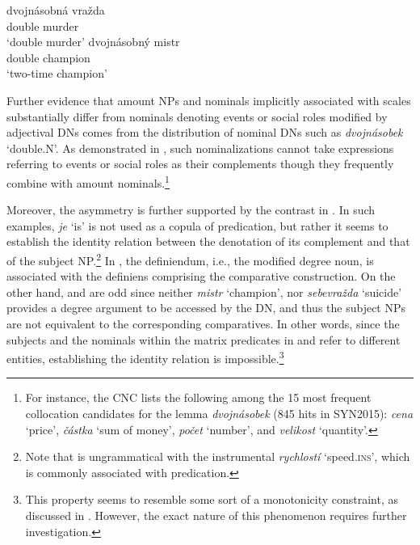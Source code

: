\documentclass[output=paper,modfonts,hidelinks,newtxmath
\ChapterDOI{10.5281/zenodo.2545513}
]{langscibook}
\begin{document}
\ea \label{dvojnasobny} \ea \gll\label{dvojnasobna-vrazda}dvojnásobná vražda\\
double murder\\
\glt `double murder'
\ex \gll dvojnásobný mistr\label{dvojnasobny-mistr}\\
double champion\\
\glt `two-time champion'
\z \z

\largerpage[2]
\noindent Further evidence that amount NPs and nominals implicitly associated with scales substantially differ from nominals denoting events or social roles modified by adjectival DNs comes from the distribution of nominal DNs such as \textit{dvojnásobek} `double.N'. As demonstrated in , such nominalizations cannot take expressions referring to events or social roles as their complements though they frequently combine with amount nominals.\footnote{For instance, the CNC lists the following among the 15 most frequent collocation candidates for the lemma \textit{dvojnásobek} (845 hits in SYN2015): \textit{cena} `price', \textit{částka} `sum of money', \textit{počet} `number', and \textit{velikost} `quantity'.}

\ea\label{dvojnásobek} 
\z \z

\noindent Moreover, the asymmetry is further supported by the contrast in . In such examples, \textit{je} `is' is not used as a copula of predication, but rather it seems to establish the identity relation between the denotation of its complement and that of the subject NP.\footnote{Note that  is ungrammatical with the instrumental \textit{rychlostí} `speed.\textsc{ins}', which is commonly associated with predication.} In , the definiendum, i.e., the modified degree noun, is associated with the definiens comprising the comparative construction. On the other hand,  and  are odd since neither \textit{mistr} `champion', nor \textit{sebevražda} `suicide' provides a degree argument to be accessed by the DN, and thus the subject NPs are not equivalent to the corresponding comparatives. In other words, since the subjects and the nominals within the matrix predicates in  and  refer to different entities, establishing the identity relation is impossible.\footnote{This property seems to resemble some sort of a monotonicity constraint, as discussed in \cite{schwarzschild2002grammar}. However, the exact nature of this phenomenon requires further investigation.}
\end{document}

